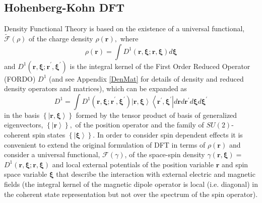 \documentclass[aps,preprint]{revtex4}%
\begin{document}
\subsection{Hohenberg-Kohn DFT}

\bigskip Density Functional Theory is based on the existence of a universal
functional, $\mathcal{\tilde{F}}\left(  \rho\right)  $ \cite{HK} of the charge
density $\rho\left(  \mathbf{r}\right)  ,$ where
\begin{equation}
\rho\left(  \mathbf{r}\right)  =\int D^{1}\left(  \mathbf{r,\xi;r,\xi}\right)
d\mathbf{\xi}%
\end{equation}
and $D^{1}\left(  \mathbf{r,\xi;r}^{\prime}\mathbf{,\xi}^{\prime}\right)  $ is
the integral kernel of the First Order Reduced Operator (FORDO) $D^{1}$
\cite{Coleman} (and see Appendix \ref{DenMat} for details of density and
reduced density operators and matrices), which can be expanded as
\begin{equation}
D^{1}=\int D^{1}\left(  \mathbf{r,\xi;r}^{\prime}\mathbf{,\xi}^{\prime
}\right)  \left\vert \mathbf{r,\xi}\right\rangle \left\langle \mathbf{r}%
^{\prime}\mathbf{,\xi}^{\prime}\right\vert d\mathbf{r}d\mathbf{r}^{\prime
}d\mathbf{\xi}d\mathbf{\xi}^{\prime}%
\end{equation}
in the basis $\left\{  \left\vert \mathbf{r,\xi}\right\rangle \right\}  $
formed by the tensor product of basis of generalized eigenvectors, $\left\{
\left\vert \mathbf{r}\right\rangle \right\}  ,$ of the position operator and
the family of $SU(2)$-coherent spin states $\left\{  \left\vert \mathbf{\xi
}\right\rangle \right\}  $. In order to consider spin dependent effects it is
convenient to extend the original formulation of DFT in terms of $\rho\left(
\mathbf{r}\right)  $ and consider a universal functional, $\mathcal{F}\left(
\gamma\right)  $, of the space-spin density $\gamma\left(  \mathbf{r,\xi
}\right)  =$ $D^{1}\left(  \mathbf{r,\xi;r,\xi}\right)  $
\cite{weiner-trickey} and local external potentials of the position variable
$\mathbf{r}$ and spin space variable $\mathbf{\xi}$ that describe the
interaction with external electric and magnetic fields (the integral kernel of
the magnetic dipole operator is local (i.e. diagonal) in the coherent state
representation but not over the spectrum of the spin operator)$.$
\end{document}
